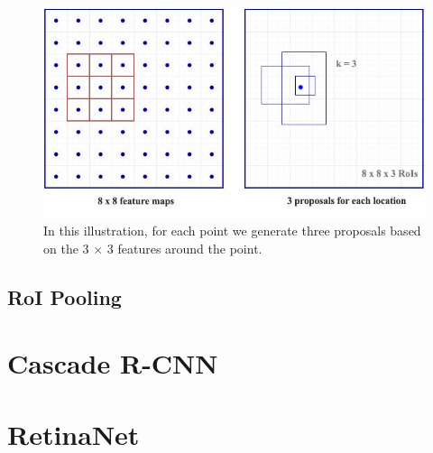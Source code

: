 \begin{figure}[h]
    \centering
    \includegraphics[width=0.7\linewidth]{Sources/Figures/rpn.jpeg}
    \caption{In this illustration, for each point we generate three proposals based on the 3 $\times$ 3 features around the point. }
    \label{fig:rpn}
\end{figure}

\subsection{RoI Pooling}

\section{Cascade R-CNN}
\section{RetinaNet}

